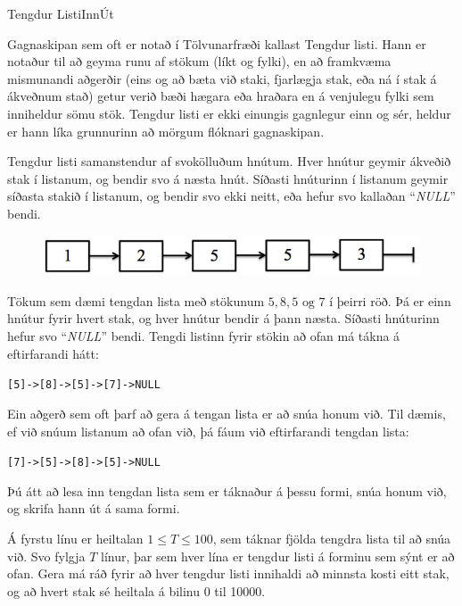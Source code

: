 \begin{problem}{Tengdur Listi}{Inn}{Út}{~}{~}

	Gagnaskipan sem oft er notað í Tölvunarfræði kallast Tengdur listi. Hann er notaður til að geyma runu af stökum (líkt og fylki), en að framkvæma mismunandi aðgerðir (eins og að bæta við staki, fjarlægja stak, eða ná í stak á ákveðnum stað) getur verið bæði hægara eða hraðara en á venjulegu fylki sem inniheldur sömu stök. Tengdur listi er ekki einungis gagnlegur einn og sér, heldur er hann líka grunnurinn að mörgum flóknari gagnaskipan.

	Tengdur listi samanstendur af svokölluðum hnútum. Hver hnútur geymir ákveðið stak í listanum, og bendir svo á næsta hnút. Síðasti hnúturinn í listanum geymir síðasta stakið í listanum, og bendir svo ekki neitt, eða hefur svo kallaðan "`\textit{NULL}"' bendi.

	\begin{figure}[h]
		\centering
		\includegraphics[scale=0.4]{../TengdurListi/linkedlist.png}
	\end{figure}

	Tökum sem dæmi tengdan lista með stökunum $5, 8, 5 \textrm{ og } 7$ í þeirri röð. Þá er einn hnútur fyrir hvert stak, og hver hnútur bendir á þann næsta. Síðasti hnúturinn hefur svo "`\textit{NULL}"' bendi. Tengdi listinn fyrir stökin að ofan má tákna á eftirfarandi hátt:

	\begin{center}
		\texttt{[5]->[8]->[5]->[7]->NULL}
	\end{center}

	Ein aðgerð sem oft þarf að gera á tengan lista er að snúa honum við. Til dæmis, ef við snúum listanum að ofan við, þá fáum við eftirfarandi tengdan lista:

	\begin{center}
		\texttt{[7]->[5]->[8]->[5]->NULL}
	\end{center}

	Þú átt að lesa inn tengdan lista sem er táknaður á þessu formi, snúa honum við, og skrifa hann út á sama formi.

	\Input

		Á fyrstu línu er heiltalan $1 \leq T \leq 100$, sem táknar fjölda tengdra lista til að snúa við. Svo fylgja $T$ línur, þar sem hver lína er tengdur listi á forminu sem sýnt er að ofan. Gera má ráð fyrir að hver tengdur listi innihaldi að minnsta kosti eitt stak, og að hvert stak sé heiltala á bilinu 0 til 10000.


\end{problem}
